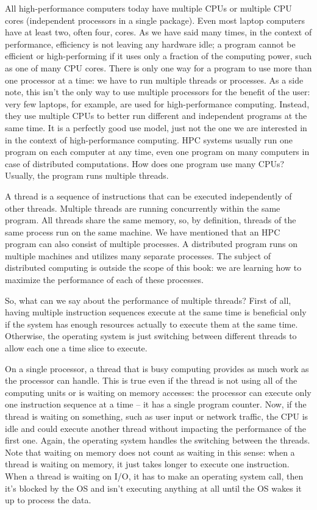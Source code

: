 
All high-performance computers today have multiple CPUs or multiple CPU cores (independent processors in a single package). Even most laptop computers have at least two, often four, cores. As we have said many times, in the context of performance, efficiency is not leaving any hardware idle; a program cannot be efficient or high-performing if it uses only a fraction of the computing power, such as one of many CPU cores. There is only one way for a program to use more than one processor at a time: we have to run multiple threads or processes. As a side note, this isn't the only way to use multiple processors for the benefit of the user: very few laptops, for example, are used for high-performance computing. Instead, they use multiple CPUs to better run different and independent programs at the same time. It is a perfectly good use model, just not the one we are interested in in the context of high-performance computing. HPC systems usually run one program on each computer at any time, even one program on many computers in case of distributed computations. How does one program use many CPUs? Usually, the program runs multiple threads.


A thread is a sequence of instructions that can be executed independently of other threads. Multiple threads are running concurrently within the same program. All threads share the same memory, so, by definition, threads of the same process run on the same machine. We have mentioned that an HPC program can also consist of multiple processes. A distributed program runs on multiple machines and utilizes many separate processes. The subject of distributed computing is outside the scope of this book: we are learning how to maximize the performance of each of these processes.

So, what can we say about the performance of multiple threads? First of all, having multiple instruction sequences execute at the same time is beneficial only if the system has enough resources actually to execute them at the same time. Otherwise, the operating system is just switching between different threads to allow each one a time slice to execute.

On a single processor, a thread that is busy computing provides as much work as the processor can handle. This is true even if the thread is not using all of the computing units or is waiting on memory accesses: the processor can execute only one instruction sequence at a time – it has a single program counter. Now, if the thread is waiting on something, such as user input or network traffic, the CPU is idle and could execute another thread without impacting the performance of the first one. Again, the operating system handles the switching between the threads. Note that waiting on memory does not count as waiting in this sense: when a thread is waiting on memory, it just takes longer to execute one instruction. When a thread is waiting on I/O, it has to make an operating system call, then it's blocked by the OS and isn't executing anything at all until the OS wakes it up to process the data.

